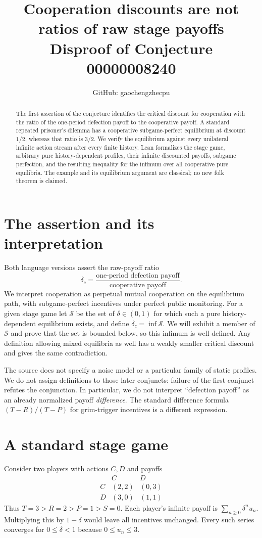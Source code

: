 \documentclass[11pt]{article}
\title{Cooperation discounts are not ratios of raw stage payoffs\\
\large Disproof of Conjecture 00000008240}
\author{GitHub: gaochengzhecpu}\date{}
\begin{document}
\maketitle
\begin{abstract}
The first assertion of the conjecture identifies the critical discount
for cooperation with the ratio of the one-period defection payoff to
the cooperative payoff. A standard repeated prisoner's dilemma has a
cooperative subgame-perfect equilibrium at discount $1/2$, whereas that
ratio is $3/2$. We verify the equilibrium against every unilateral
infinite action stream after every finite history. Lean formalizes the
stage game, arbitrary pure history-dependent profiles, their infinite
discounted payoffs, subgame perfection, and the resulting inequality for
the infimum over all cooperative pure equilibria. The example and its
equilibrium argument are classical; no new folk theorem is claimed.
\end{abstract}

\section*{The assertion and its interpretation}
Both language versions assert the raw-payoff ratio
\[
 \delta_c=\frac{\text{one-period defection payoff}}
 {\text{cooperative payoff}}.
\]
We interpret cooperation as perpetual mutual cooperation on the
equilibrium path, with subgame-perfect incentives under perfect public
monitoring. For a given stage game let $\mathcal S$ be the set of
$\delta\in(0,1)$ for which such a pure history-dependent equilibrium
exists, and define $\delta_c=\inf\mathcal S$. We will exhibit a member
of $\mathcal S$ and prove that the set is bounded below, so this infimum
is well defined. Any definition allowing mixed equilibria as well has
a weakly smaller critical discount and gives the same contradiction.

The source does not specify a noise model or a particular family of
static profiles. We do not assign definitions to those later conjuncts:
failure of the first conjunct refutes the conjunction. In particular,
we do not interpret ``defection payoff'' as an already normalized
payoff \emph{difference}. The standard difference formula
$(T-R)/(T-P)$ for grim-trigger incentives is a different expression.

\section*{A standard stage game}
Consider two players with actions $C,D$ and payoffs
\[
\begin{array}{c|cc}
 & C & D\\\hline
 C &(2,2)&(0,3)\\
 D &(3,0)&(1,1)
\end{array}
\]
Thus $T=3>R=2>P=1>S=0$. Each player's infinite payoff is
$\sum_{n\geq0}\delta^n u_n$. Multiplying this by $1-\delta$ would
leave all incentives unchanged. Every such series converges for
$0\leq\delta<1$ because $0\leq u_n\leq3$.
\end{document}

